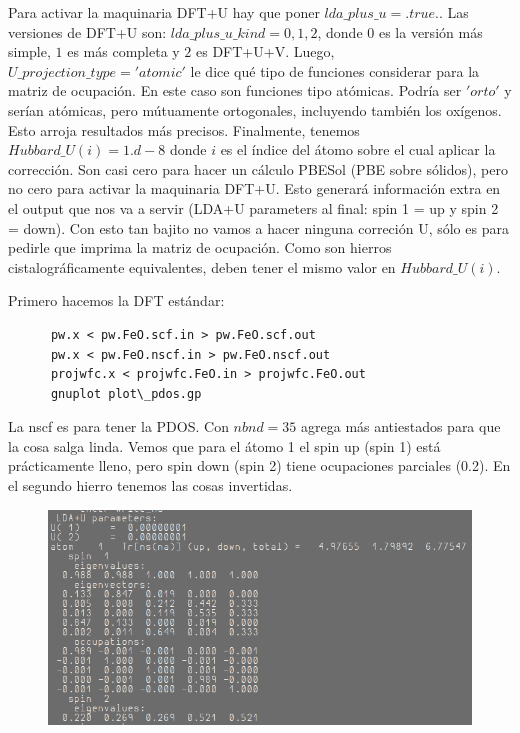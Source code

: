   Para activar la maquinaria DFT+U hay que poner $lda\_plus\_u = .true.$. Las versiones de DFT+U son: $lda\_plus\_u\_kind = 0,1,2$, donde $0$ es la versión más simple, $1$ es más completa y $2$ es DFT+U+V. Luego, $U\_projection\_type = 'atomic'$ le dice qué tipo de funciones considerar para la matriz de ocupación. En este caso son funciones tipo atómicas. Podría ser $'orto'$ y serían atómicas, pero mútuamente ortogonales, incluyendo también los oxígenos. Esto arroja resultados más precisos. Finalmente, tenemos $Hubbard\_U(i) = 1.d-8$ donde $i$ es el índice del átomo sobre el cual aplicar la corrección. Son casi cero para hacer un cálculo PBESol (PBE sobre sólidos), pero no cero para activar la maquinaria DFT+U. Esto generará información extra en el output que nos va a servir (LDA+U parameters al final: spin 1 = up y spin 2 = down). Con esto tan bajito no vamos a hacer ninguna correción U, sólo es para pedirle que imprima la matriz de ocupación. Como son hierros cistalográficamente equivalentes, deben tener el mismo valor en $Hubbard\_U(i)$.

  Primero hacemos la DFT estándar:
    \begin{verbatim}
      pw.x < pw.FeO.scf.in > pw.FeO.scf.out
      pw.x < pw.FeO.nscf.in > pw.FeO.nscf.out
      projwfc.x < projwfc.FeO.in > projwfc.FeO.out
      gnuplot plot\_pdos.gp
    \end{verbatim}

  La nscf es para tener la PDOS. Con $nbnd = 35$ agrega más antiestados para que la cosa salga linda. Vemos que para el átomo 1 el spin up (spin 1) está prácticamente lleno, pero spin down (spin 2) tiene ocupaciones parciales (0.2). En el segundo hierro tenemos las cosas invertidas.
    \begin{figure}[H]
        \centering
        \includegraphics[scale = 0.5]{figs/D4/LDA+U.png}
    \end{figure}

